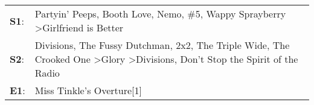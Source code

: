 \begin{supertabular}{p{0.03\textwidth}p{0.92\textwidth}}
 \textbf{S1}:  &                                                                                                                 Partyin' Peeps\textsuperscript{}, \enspace Booth Love\textsuperscript{}, \enspace Nemo\textsuperscript{}, \enspace \#5\textsuperscript{}, \enspace Wappy Sprayberry\textsuperscript{} \textgreater \enspace Girlfriend is Better\textsuperscript{}  \enspace  \\
 \textbf{S2}:  &  Divisions\textsuperscript{}, \enspace The Fussy Dutchman\textsuperscript{}, \enspace 2x2\textsuperscript{}, \enspace The Triple Wide\textsuperscript{}, \enspace The Crooked One\textsuperscript{} \textgreater \enspace Glory\textsuperscript{} \textgreater \enspace Divisions\textsuperscript{}, \enspace Don't Stop the Spirit of the Radio\textsuperscript{}  \enspace  \\
 \textbf{E1}:  &                                                                                                                                                                                                                                                                                                                        Miss Tinkle's Overture[1]\textsuperscript{}  \enspace  \\
\end{supertabular}
